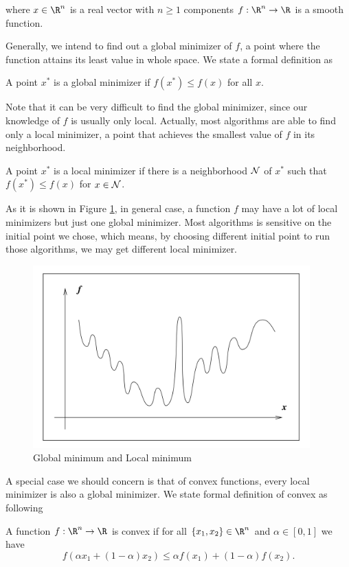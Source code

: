 \documentclass[11pt]{report}
\begin{document}
where $x\in \R^n$ is a real vector with $n\geq 1$ components $f:\R^n\rightarrow \R$ is a smooth function.

Generally, we intend to find out a global minimizer of $f$, a point where the function attains its least value in whole space. We state a formal definition as
\begin{definition}
    A point $x^*$ is a global minimizer if $f(x^*)\leq f(x)$ for all $x$.
\end{definition}

Note that it can be very difficult to find the global minimizer, since our knowledge of $f$ is usually only local. Actually, most algorithms are able to find only a local minimizer, a point that achieves the smallest value of $f$ in its neighborhood.
\begin{definition}
    A point $x^*$ is a local minimizer if there is a neighborhood ${\cal N}$ of $x^*$ such that $f(x^*)\leq f(x)$ for $x\in {\cal N}$.
\end{definition}

As it is shown in Figure \ref{fig:global_min}, in general case, a function $f$ may have a lot of local minimizers but just one global minimizer. Most algorithms is sensitive on the initial point we chose, which means, by choosing different initial point to run those algorithms, we may get different local minimizer.

\begin{figure}[htpb]
    \centering
    \includegraphics[width=0.95\textwidth]{../images/global_min}
    \caption{Global minimum and Local minimum}
    \label{fig:global_min}
\end{figure}

A special case we should concern is that of convex functions, every local minimizer is also a global minimizer. We state formal definition of convex as following
\begin{definition}
    A function $f: \R^n \rightarrow \R$ is convex if for all $\{x_1,x_2\}\in \R^n$ and $\alpha\in [0,1]$ we have
    \begin{equation}
        f(\alpha x_1 +(1- \alpha)x_2)\leq \alpha f(x_1) +(1- \alpha)f(x_2).
    \end{equation}
\end{definition}
\end{document}

